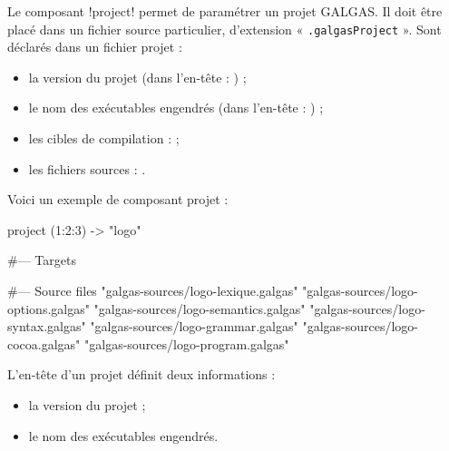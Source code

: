 


Le composant \ggs!project! permet de paramétrer un projet GALGAS. Il doit être placé dans un fichier source particulier, d'extension « \texttt{.galgasProject} ». Sont déclarés dans un fichier projet :
\begin{itemize}
  \item la version du projet (dans l'en-tête : ) ;
  \item le nom des exécutables engendrés (dans l'en-tête : ) ;
  \item les cibles de compilation :   ;
  \item les fichiers sources : .
\end{itemize}

Voici un exemple de composant projet :

\begin{galgas}
project (1:2:3) -> "logo" {
#--- Targets

#--- Source files
  "galgas-sources/logo-lexique.galgas"
  "galgas-sources/logo-options.galgas"
  "galgas-sources/logo-semantics.galgas"
  "galgas-sources/logo-syntax.galgas"
  "galgas-sources/logo-grammar.galgas"
  "galgas-sources/logo-cocoa.galgas"
  "galgas-sources/logo-program.galgas"
}
\end{galgas}








L'en-tête d'un projet définit deux informations :
\begin{itemize}
  \item la version du projet ;
  \item le nom des exécutables engendrés.
\end{itemize}

